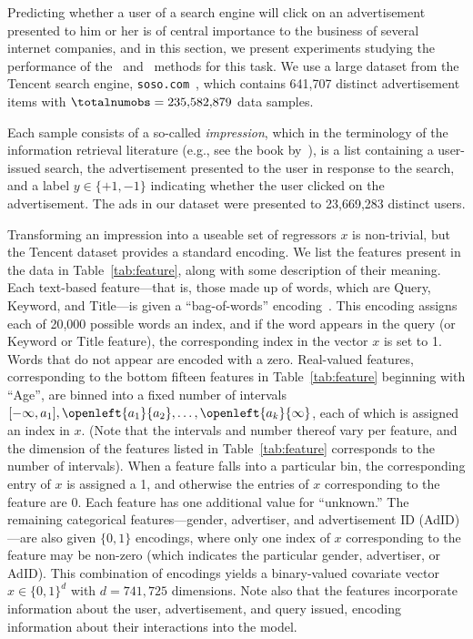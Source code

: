 \documentclass[11pt,twoside]{article}
\theoremstyle{definition}
\begin{document}
Predicting whether a user of a search engine will click on an
advertisement presented to him or her is of central importance to the
business of several internet companies, and in this section, we
present experiments studying the performance of the \avgm\ and
\savgm\ methods for this task.  We use a large dataset from the
Tencent search engine, {\tt soso.com}~\citep{Kdd12}, which contains
641,707 distinct advertisement items with $\totalnumobs =
235,\!582,\!879$ data samples.

Each sample consists of a so-called \emph{impression}, which in the
terminology of the information retrieval literature (e.g., see the
book by~\citet{ManningRaSc08}), is a list containing a user-issued
search, the advertisement presented to the user in response to the
search, and a label $y \in \{+1, -1\}$ indicating whether the user
clicked on the advertisement.  The ads in our dataset were presented
to 23,669,283 distinct users.

Transforming an impression into a useable set of regressors $x$ is
non-trivial, but the Tencent dataset provides a standard encoding. We
list the features present in the data in Table~\ref{tab:feature},
along with some description of their meaning. Each text-based
feature---that is, those made up of words, which are Query, Keyword,
and Title---is given a ``bag-of-words''
encoding~\citep{ManningRaSc08}. This encoding assigns each of 20,000
possible words an index, and if the word appears in the query (or
Keyword or Title feature), the corresponding index in the vector $x$
is set to 1. Words that do not appear are encoded with a zero.
Real-valued features, corresponding to the bottom fifteen features in
Table~\ref{tab:feature} beginning with ``Age'', are binned into a
fixed number of intervals $[-\infty, a_1], \openleft{a_1}{a_2},
\ldots, \openleft{a_k}{\infty}$, each of which is assigned an index in
$x$. (Note that the intervals and number thereof vary per feature, and
the dimension of the features listed in Table~\ref{tab:feature}
corresponds to the number of intervals). When a feature falls into a
particular bin, the corresponding entry of $x$ is assigned a 1, and
otherwise the entries of $x$ corresponding to the feature are 0. Each
feature has one additional value for ``unknown.'' The remaining
categorical features---gender, advertiser, and advertisement ID
(AdID)---are also given $\{0, 1\}$ encodings, where only one index of
$x$ corresponding to the feature may be non-zero (which indicates the
particular gender, advertiser, or AdID). This combination of encodings
yields a binary-valued covariate vector $x \in \{0, 1\}^d$ with $d =
741,\!725$ dimensions. Note also that the features incorporate
information about the user, advertisement, and query issued, encoding
information about their interactions into the model.
\end{document}
